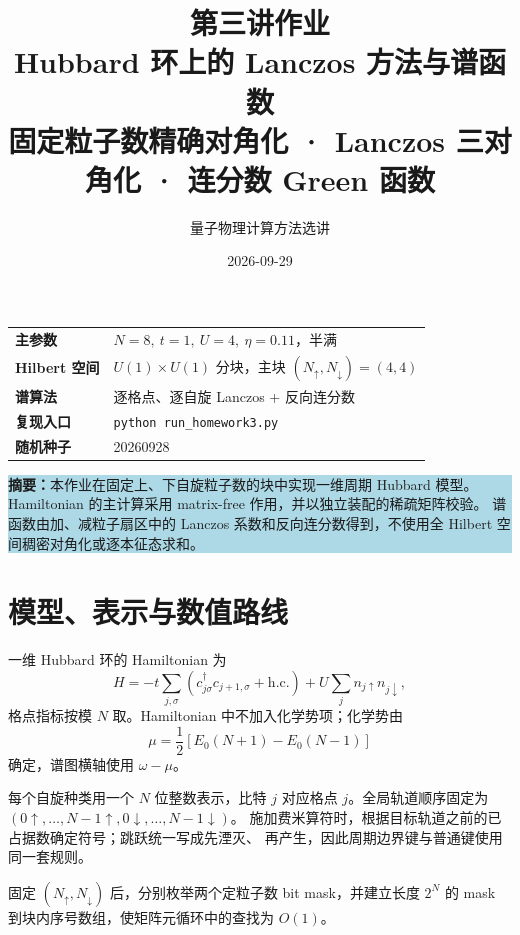 \documentclass[UTF8,a4paper,11pt,fontset=windows]{ctexart}
\title{\vspace{2.2cm}\textbf{\Huge\color{navy}第三讲作业}\\[0.6em]
\textbf{\LARGE Hubbard 环上的 Lanczos 方法与谱函数}\\[1.4em]
\large 固定粒子数精确对角化 · Lanczos 三对角化 · 连分数 Green 函数}
\author{量子物理计算方法选讲}
\date{2026-09-29}
\renewcommand{\arraystretch}{1.22}
\newcommand{\code}[1]{\texttt{#1}}
\begin{document}
\maketitle
\thispagestyle{empty}
\vfill
\begin{center}
\renewcommand{\arraystretch}{1.35}
\begin{tabular}{>{\bfseries}p{3.2cm}p{10.5cm}}
\toprule
主参数 & $N=8,\ t=1,\ U=4,\ \eta=0.11$，半满 \\
Hilbert 空间 & $U(1)\times U(1)$ 分块，主块 $(N_\uparrow,N_\downarrow)=(4,4)$ \\
谱算法 & 逐格点、逐自旋 Lanczos + 反向连分数 \\
复现入口 & \code{python run\_homework3.py} \\
随机种子 & 20260928 \\
\bottomrule
\end{tabular}
\end{center}
\vspace{1.2cm}
\noindent\colorbox{lightblue}{\parbox{0.94\textwidth}{
\textbf{摘要：}本作业在固定上、下自旋粒子数的块中实现一维周期 Hubbard 模型。
Hamiltonian 的主计算采用 matrix-free 作用，并以独立装配的稀疏矩阵校验。
谱函数由加、减粒子扇区中的 Lanczos 系数和反向连分数得到，不使用全 Hilbert
空间稠密对角化或逐本征态求和。}}
\vfill
\clearpage

\tableofcontents
\clearpage

\section{模型、表示与数值路线}

一维 Hubbard 环的 Hamiltonian 为
\begin{equation}
H=-t\sum_{j,\sigma}\left(c^\dagger_{j\sigma}c_{j+1,\sigma}+\mathrm{h.c.}\right)
  +U\sum_j n_{j\uparrow}n_{j\downarrow},
\end{equation}
格点指标按模 $N$ 取。Hamiltonian 中不加入化学势项；化学势由
\begin{equation}
\mu=\frac12\left[E_0(N+1)-E_0(N-1)\right]
\end{equation}
确定，谱图横轴使用 $\omega-\mu$。

每个自旋种类用一个 $N$ 位整数表示，比特 $j$ 对应格点 $j$。全局轨道顺序固定为
$(0\uparrow,\ldots,N-1\uparrow,0\downarrow,\ldots,N-1\downarrow)$。
施加费米算符时，根据目标轨道之前的已占据数确定符号；跳跃统一写成先湮灭、
再产生，因此周期边界键与普通键使用同一套规则。

固定 $(N_\uparrow,N_\downarrow)$ 后，分别枚举两个定粒子数 bit mask，并建立长度
$2^N$ 的 mask 到块内序号数组，使矩阵元循环中的查找为 $O(1)$。
\end{document}
